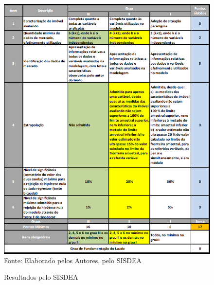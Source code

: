 \begin{figure}[H]
	\centering  \small 		\caption{ Resultados pelo SISDEA}
	\includegraphics[width=0.947\linewidth]{figura/screenshot033}
	\label{fig:screenshot033}\\{ Fonte: Elaborado pelos Autores, pelo SISDEA}
\end{figure}

